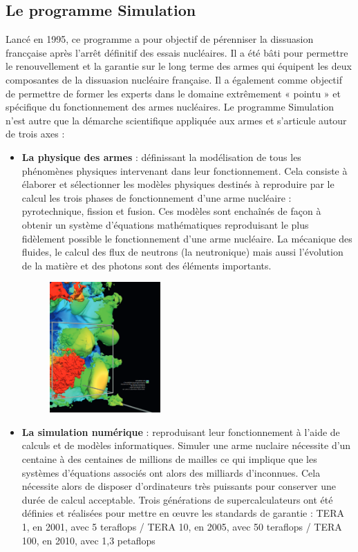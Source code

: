 \documentclass[12pt,a4paper]{report}
\begin{document}
\subsection{Le programme Simulation}
Lancé en 1995, ce programme a pour objectif de pérenniser la dissuasion francçaise après l’arrêt définitif des essais nucléaires. Il a été bâti pour permettre le renouvellement et la garantie sur le long terme des armes qui équipent les deux composantes de la dissuasion nucléaire française. Il a également comme objectif de permettre de former les experts dans le domaine extrêmement « pointu » et spécifique du fonctionnement des armes nucléaires. Le programme Simulation n’est autre que la démarche scientifique appliquée aux armes et s'articule autour de trois axes :
\renewcommand{\labelitemi}{$\bullet$}
\begin{itemize}
\item \textbf{La physique des armes} : définissant la modélisation de tous les phénomènes physiques intervenant dans leur fonctionnement. Cela consiste à élaborer et sélectionner les modèles physiques destinés à reproduire par le calcul les trois phases de fonctionnement d’une
arme nucléaire : pyrotechnique, fission et fusion. Ces modèles sont enchaînés de façon à obtenir un système d’équations mathématiques reproduisant le plus fidèlement possible le fonctionnement
d’une arme nucléaire. La mécanique des fluides, le calcul des flux de neutrons (la neutronique) mais aussi l’évolution de la matière et des photons sont des éléments importants.

\begin{figure}[H]
    \centering %
    \includegraphics[height=5cm]{Assets/Physique_arme.png}
\end{figure}

\item \textbf{La simulation numérique} : reproduisant leur fonctionnement à l'aide de calculs et de modèles informatiques. Simuler une arme nuclaire nécessite d'un centaine à des centaines de millions de mailles ce qui implique que les systèmes d'équations associés ont alors des milliards d'inconnues. Cela nécessite alors de disposer d’ordinateurs très puissants
pour conserver une durée de calcul acceptable. Trois générations de supercalculateurs ont été définies et réalisées pour mettre en œuvre les standards de garantie : TERA 1, en 2001, avec 5 teraflops / TERA 10, en 2005, avec 50 teraflops /  TERA 100, en 2010, avec 1,3 petaflops


\end{itemize}
\end{document}
